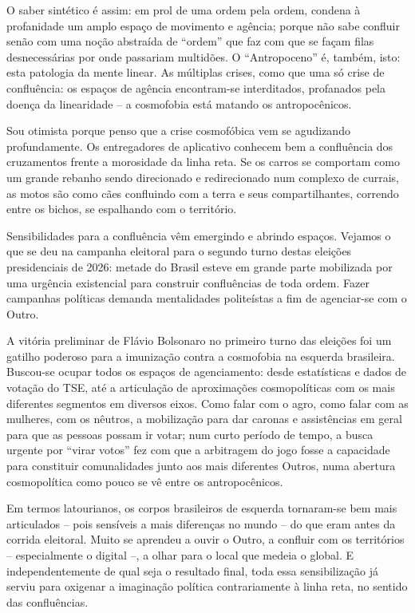 O saber sintético é assim: em prol de uma ordem pela ordem, condena à profanidade um amplo espaço de movimento e agência; porque não sabe confluir senão com uma noção abstraída de \enquote{ordem} que faz com que se façam filas desnecessárias por onde passariam multidões. O \enquote{Antropoceno} é, também, isto: esta patologia da mente linear. As múltiplas crises, como que uma só crise de confluência: os espaços de agência encontram-se interditados, profanados pela doença da linearidade -- a cosmofobia está matando os antropocênicos.

Sou otimista porque penso que a crise cosmofóbica vem se agudizando profundamente. Os entregadores de aplicativo conhecem bem a confluência dos cruzamentos frente a morosidade da linha reta. Se os carros se comportam como um grande rebanho sendo direcionado e redirecionado num complexo de currais, as motos são como cães confluindo com a terra e seus compartilhantes, correndo entre os bichos, se espalhando com o território.

Sensibilidades para a confluência vêm emergindo e abrindo espaços. Vejamos o que se deu na campanha eleitoral para o segundo turno destas eleições presidenciais de 2026: metade do Brasil esteve em grande parte mobilizada por uma urgência existencial para construir confluências de toda ordem. Fazer campanhas políticas demanda mentalidades politeístas a fim de agenciar-se com o Outro.

A vitória preliminar de Flávio Bolsonaro no primeiro turno das eleições foi um gatilho poderoso para a imunização contra a cosmofobia na esquerda brasileira. Buscou-se ocupar todos os espaços de agenciamento: desde estatísticas e dados de votação do TSE, até a articulação de aproximações cosmopolíticas com os mais diferentes segmentos em diversos eixos. Como falar com o agro, como falar com as mulheres, com os nêutros, a mobilização para dar caronas e assistências em geral para que as pessoas possam ir votar; num curto período de tempo, a busca urgente por \enquote{virar votos} fez com que a arbitragem do jogo fosse a capacidade para constituir comunalidades junto aos mais diferentes Outros, numa abertura cosmopolítica como pouco se vê entre os antropocênicos.

Em termos latourianos, os corpos brasileiros de esquerda tornaram-se bem mais articulados -- pois sensíveis a mais diferenças no mundo -- do que eram antes da corrida eleitoral. Muito se aprendeu a ouvir o Outro, a confluir com os territórios -- especialmente o digital --, a olhar para o local que medeia o global. E independentemente de qual seja o resultado final, toda essa sensibilização já serviu para oxigenar a imaginação política contrariamente à linha reta, no sentido das confluências.

